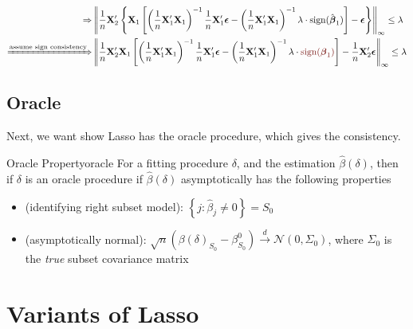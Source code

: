 \documentclass[twoside]{article}
\begin{document}
\begin{itemize}
\begin{align*}
        \Rightarrow & \left\Vert \frac{1}{n}\mathbf{X}_2'\left\{ \mathbf{X}_1 \left[ \left( \frac{1}{n}\mathbf{X}_1' \mathbf{X}_1 \right)^{-1} \frac{1}{n}\mathbf{X}_1'\boldsymbol{\epsilon} - \left( \frac{1}{n}\mathbf{X}_1' \mathbf{X}_1 \right)^{-1} \lambda \cdot \mathrm{sign}(\hat{\boldsymbol{\beta}}_1) \right] -\boldsymbol{\epsilon} \right\} \right\Vert _{\infty} \leq \lambda \\
        \xRightarrow{\text{assume sign consistency}} & \left\Vert \frac{1}{n}\mathbf{X}_2' \mathbf{X}_1 \left[ \left( \frac{1}{n}\mathbf{X}_1' \mathbf{X}_1 \right)^{-1} \frac{1}{n}\mathbf{X}_1'\boldsymbol{\epsilon} - \left( \frac{1}{n}\mathbf{X}_1' \mathbf{X}_1 \right)^{-1} \lambda \cdot \textcolor{myred}{\mathrm{sign}({\boldsymbol{\beta}}_1)} \right]  - \frac{1}{n}\mathbf{X}_2'\boldsymbol{\epsilon} \right\Vert _{\infty} \leq \lambda 
    \end{align*}
\end{itemize}

\subsection{Oracle}
Next, we want show Lasso has the oracle procedure, which gives the consistency.
\begin{definition}{Oracle Property}{oracle}
    For a fitting procedure $\delta$, and the estimation $\hat{\beta}(\delta)$, then if $\delta$ is an oracle procedure if $\hat{\beta}(\delta)$ asymptotically has the following properties 
    \begin{itemize}
        \item {} (identifying right subset model): $\left\{ j:\hat{\beta}_j \neq 0 \right\} = S_0$
        \item {} (asymptotically normal): $\sqrt{n}\left( \beta(\delta)_{S_0} - \beta^0_{S_0} \right) \xrightarrow{d} \mathcal{N}(0,\Sigma_0)$, where $\Sigma_0$ is the \textit{true} subset covariance matrix
    \end{itemize}
\end{definition}



\section{Variants of Lasso}
\end{document}
